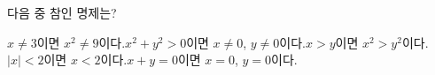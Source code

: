 다음 중 참인 명제는? 
\begin{choicesv}{$x\ne 3$이면 $x^2\ne 9$이다.}{$x^2+y^2>0$이면 $x\ne 0$, $y\ne 0$이다.}{$x>y$이면 $x^2>y^2$이다.}{$|x|<2$이면 $x<2$이다.}{$x+y=0$이면 $x=0$, $y=0$이다.}\end{choicesv}
